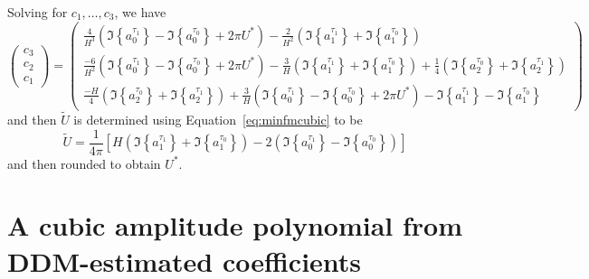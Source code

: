 Solving for $c_1, \dotsc, c_3$, we have
\[
    \begin{pmatrix}
        c_{3} \\
        c_{2} \\
        c_{1}
    \end{pmatrix}
    =
    \begin{pmatrix}
        \frac{4}{H^3} \left( \Im \left\{ a^{\tau_1}_0 \right\}
            - \Im \left\{ a^{\tau_0}_0 \right\} + 2 \pi U^{\ast} \right)
        - \frac{2}{H^{2}} \left( \Im \left\{ a^{\tau_1}_1 \right\}
            + \Im \left\{ a^{\tau_0}_1 \right\} \right) \\
        \frac{-6}{H^2} \left( \Im \left\{ a^{\tau_1}_0 \right\}
            - \Im \left\{ a^{\tau_0}_0 \right\} + 2 \pi U^{\ast} \right)
        - \frac{3}{H} \left( \Im \left\{ a^{\tau_1}_1 \right\}
            + \Im \left\{ a^{\tau_0}_1 \right\} \right)
        + \frac{1}{4}  \left( \Im \left\{ a^{\tau_0}_{2} \right\} + \Im \left\{
            a^{\tau_1}_{2} \right\} \right) \\
        \frac{-H}{4}  \left( \Im \left\{ a^{\tau_0}_{2} \right\} + \Im \left\{
            a^{\tau_1}_{2} \right\} \right) 
        + \frac{3}{H} \left( \Im \left\{ a^{\tau_1}_0 \right\}
            - \Im \left\{ a^{\tau_0}_0 \right\} + 2 \pi U^{\ast} \right)
        -  \Im \left\{ a^{\tau_1}_1 \right\}
            - \Im \left\{ a^{\tau_0}_1 \right\}
    \end{pmatrix}
\]
and then $\tilde{U}$ is determined using Equation~\ref{eq:minfmcubic} to be
\[
    \tilde{U} = \frac{1}{4 \pi} \left[ H \left( \Im \left\{ a^{\tau_1}_1
            \right\} + \Im \left\{
        a^{\tau_0}_1 \right\} \right)
        -2 \left( \Im \left\{ a^{\tau_1}_0 \right\} - \Im \left\{
        a^{\tau_0}_0 \right\} \right) \right]
\]
and then rounded to obtain $U^{\ast}$.

\section{A cubic amplitude polynomial from DDM-estimated coefficients \label{sec:cubicamppoly}}

